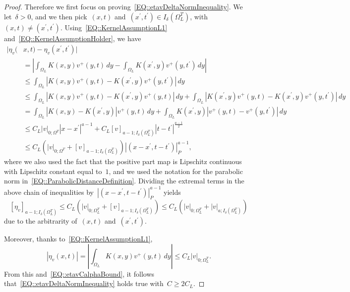 \documentclass[12pt,a4paper]{amsart}
\numberwithin{equation}{section}
\theoremstyle{definition}
\theoremstyle{remark}
\newcommand{\abs}[1]{\left\lvert#1\right\rvert}
\renewcommand{\leq}{\leqslant}
\renewcommand{\geq}{\geqslant}
\begin{document}
\begin{proof}
    Therefore we first focus on proving~\eqref{EQ::etavDeltaNormInequality}. We let~$\delta > 0$, and we then pick~$(x,t)$ and~$(x^\prime, t^\prime) \in I_\delta(\Omega_L^T)$, with~$(x,t) \neq (x^\prime, t^\prime)$. Using~\eqref{EQ::KernelAssumptionL1} and~\eqref{EQ::KernelAssumptionHolder}, we have
    \begin{align}
            |\eta_v(&x,t)-\eta_v(x^\prime, t^\prime)|\\
                &=\abs{\int_{\Omega_L} K(x,y)v^+(y,t)\, dy - \int_{\Omega_L}K(x^\prime,y)v^+(y,t^\prime)\, dy}\\
                &\leq \int_{\Omega_L}\abs{K(x,y)v^+(y,t) - K(x^\prime, y)v^+(y,t^\prime)}\, dy\\
                &\leq \int_{\Omega_L}\abs{K(x,y)v^+(y,t) - K(x^\prime, y)v^+(y,t)}\, dy+\int_{\Omega_L}\abs{K(x^\prime,y)v^+(y,t) - K(x^\prime, y)v^+(y,t^\prime)}\, dy\\
                &=\int_{\Omega_L}\abs{K(x,y) - K(x^\prime, y)}v^+(y,t)\, dy + \int_{\Omega_L} K(x^\prime,y)\abs{v^+(y,t) - v^+(y,t^\prime)}\, dy\\
                &\leq C_L \abs{v}_{0; \Omega^T} \abs{x-x^\prime}^{a-1} + C_L {[v]}_{a-1; I_\delta(\Omega_L^T)} \abs{t-t^\prime}^{\frac{a-1}{2}}\\
                &\leq C_L \left(\abs{v}_{0; \Omega^T} + {[v]}_{a-1; I_\delta(\Omega_L^T)}\right) \abs{(x-x^\prime, t-t^\prime)}_{P}^{a-1},
    \end{align}
    where we also used the fact that the positive part map is Lipschitz continuous with Lipschitz constant equal to~$1$, and we used the notation for the parabolic norm in~\eqref{EQ::ParabolicDistanceDefinition}. Dividing the extremal terms in the above chain of inequalities by~$\abs{(x-x^\prime, t-t^\prime)}_{P}^{a-1}$ yields
    \begin{equation}\label{EQ::etavCalphaBound}
        {[\eta_v]}_{a-1; I_\delta(\Omega_L^T)} \leq C_L \left(\abs{v}_{0; \Omega_L^T} + {[v]}_{a-1; I_\delta(\Omega_L^T)}\right) \leq C_L \left(\abs{v}_{0;\Omega_L^T}+\abs{v}_{{a; I_\delta(\Omega_L^T)}}\right)
    \end{equation}
    due to the arbitrarity of~$(x,t)$ and~$(x^\prime, t^\prime)$.

    Moreover, thanks to~\eqref{EQ::KernelAssumptionL1},
    \begin{equation}
        \abs{\eta_v(x,t)} = \abs{\int_{\Omega_L} K(x,y)v^+(y,t)\,dy} \leq C_L \abs{v}_{0;\Omega_L^T}.
    \end{equation}
    From this and~\eqref{EQ::etavCalphaBound}, it follows that~\eqref{EQ::etavDeltaNormInequality} holds true with~$C \geq 2C_L$.


\end{proof}
\end{document}
